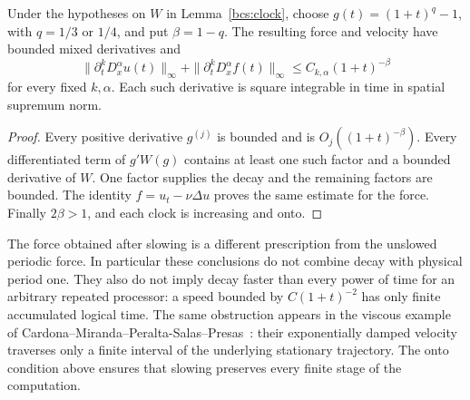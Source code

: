 \begin{proposition}
\label{bcs:power-clock}
Under the hypotheses on $W$ in Lemma~\ref{bcs:clock}, choose
$g(t)=(1+t)^q-1$, with $q=1/3$ or $1/4$, and put $\beta=1-q$.
The resulting force and velocity have bounded mixed derivatives and
\[
 \|\partial_t^kD_x^\alpha u(t)\|_\infty+
 \|\partial_t^kD_x^\alpha f(t)\|_\infty
 \le C_{k,\alpha}(1+t)^{-\beta}
\]
for every fixed $k,\alpha$.  Each such derivative is square integrable
in time in spatial supremum norm.
\end{proposition}
\begin{proof}
Every positive derivative $g^{(j)}$ is bounded and is
$O_j((1+t)^{-\beta})$.  Every differentiated term of $g'W(g)$
contains at least one such factor and a bounded derivative of $W$.
One factor supplies the decay and the remaining factors are bounded.
The identity $f=u_t-\nu\Delta u$ proves the same estimate for the
force.  Finally $2\beta>1$, and each clock is increasing and onto.
\end{proof}

The force obtained after slowing is a different prescription from the
unslowed periodic force.  In particular these conclusions do not combine
decay with physical period one.  They also do not imply decay faster than
every power of time for an arbitrary repeated processor: a speed bounded
by $C(1+t)^{-2}$ has only finite accumulated logical time.
The same obstruction appears in the viscous example of
Cardona--Miranda--Peralta-Salas--Presas~\cite[Section~6B]{CMPP}:
their exponentially damped velocity traverses only a finite interval
of the underlying stationary trajectory.  The onto condition above
ensures that slowing preserves every finite stage of the computation.
